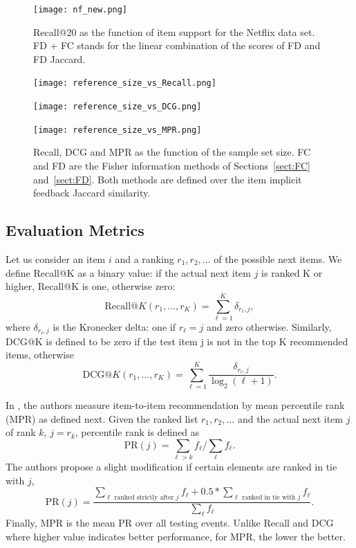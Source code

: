 \documentclass[preprint]{sig-alternate-05-2015}
\begin{document}
\begin{figure}
\centerline{
  \texttt{[image: nf\_new.png]}}

\caption[]{Recall@20 as the function of item support for the Netflix data set.
FD + FC stands for the linear combination of the scores of FD and FD Jaccard.}
\label{fig:supp_netf}
\end{figure}


\begin{figure}[t]
\centerline{
\texttt{[image: reference\_size\_vs\_Recall.png]}}
\centerline{
\texttt{[image: reference\_size\_vs\_DCG.png]}}
\centerline{
  \texttt{[image: reference\_size\_vs\_MPR.png]}}

\caption[]{Recall, DCG and MPR as the function of the sample set size.
  FC and FD are the Fisher information methods of Sections~\ref{sect:FC} and~\ref{sect:FD}.
  Both methods are defined over the item implicit feedback Jaccard similarity.}
\label{fig:samples}
\end{figure}



\subsection{Evaluation Metrics}

Let us consider an item $i$ and a ranking $r_1,r_2,\ldots$ of the possible next items.
We define Recall@K as a binary value: if the actual next item $j$ is ranked K or higher, Recall@K is one, otherwise zero:
%
\begin{equation}
\mbox{Recall@}K(r_1,\ldots,r_K) = \sum_{\ell=1}^K \delta_{r_\ell,j},
\nonumber
\end{equation}
where $\delta_{r_\ell,j}$ is the Kronecker delta: one if $r_\ell=j$ and zero otherwise. Similarly, DCG@K is defined to be zero if the test 
item j is not in the top K recommended items, otherwise
\begin{equation}
\mbox{DCG@}K(r_1,\ldots,r_K) = \sum_{\ell=1}^K \frac{\delta_{r_\ell,j}}{\log_2(\ell+1)}.
\nonumber
\end{equation} 


In \cite{koenigstein2013towards}, the authors measure item-to-item recommendation by mean percentile rank (MPR) as defined next.
Given the ranked list $r_1,r_2,\ldots$ and the actual next item $j$ of rank $k$, $j=r_k$, percentile rank is defined as %
%
\begin{equation}
\text{PR}(j) = \sum_{\ell > k} f_\ell / \sum_\ell f_\ell.
\nonumber
\end{equation}
The authors propose a slight modification if certain elements are ranked in tie with $j$,
\begin{equation}
\text{PR}(j) = \frac{\sum_{\text{$\ell$ ranked strictly after $j$}} f_\ell + 0.5*\sum_{\text{$\ell$ ranked in tie with $j$}} f_\ell} {\sum_\ell f_\ell}.
\nonumber
\end{equation}
%
Finally, MPR is the mean PR over all testing events.
Unlike Recall and DCG where higher value indicates better performance, for MPR, the lower the better.
\end{document}
